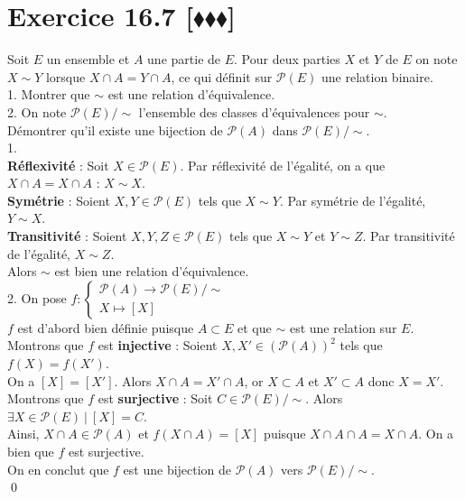 \documentclass[10pt]{article}
\begin{document}

\section*{Exercice 16.7 [$\blacklozenge\blacklozenge\blacklozenge$]}
\begin{tcolorbox}[enhanced, width=7.6in, center, size=fbox, fontupper=\large, drop shadow southwest]
    Soit $E$ un ensemble et $A$ une partie de $E$. Pour deux parties $X$ et $Y$ de $E$ on note $X\sim Y$ lorsque $X \cap A = Y \cap A$, ce qui définit sur $\mathcal{P}(E)$ une relation binaire.\\
    1. Montrer que $\sim$ est une relation d'équivalence.\\
    2. On note $\mathcal{P}(E)/\sim$ l'ensemble des classes d'équivalences pour $\sim$.\\
    Démontrer qu'il existe une bijection de $\mathcal{P}(A)$ dans $\mathcal{P}(E)/\sim$.\\[0.2cm]
    1.\\
    \textbf{Réflexivité} : Soit $X\in\mathcal{P}(E)$. Par réflexivité de l'égalité, on a que $X \cap A = X \cap A$ : $X \sim X$.\\
    \textbf{Symétrie} : Soient $X,Y\in\mathcal{P}(E)$ tels que $X \sim Y$. Par symétrie de l'égalité, $Y \sim X$.\\
    \textbf{Transitivité} : Soient $X,Y,Z \in \mathcal{P}(E)$ tels que $X \sim Y$ et $Y \sim Z$. Par transitivité de l'égalité, $X \sim Z$.\\
    Alors $\sim$ est bien une relation d'équivalence.\\[0.15cm]
    2. 
    On pose $f:\begin{cases}
        \mathcal{P}(A) \to \mathcal{P}(E)/\sim\\
        X \mapsto [X]
    \end{cases}$\\
    $f$ est d'abord bien définie puisque $A \subset E$ et que $\sim$ est une relation sur $E$.\\[0.15cm]
    Montrons que $f$ est \textbf{injective} : Soient $X,X' \in (\mathcal{P}(A))^2$ tels que $f(X) = f(X')$.\\
    On a $[X] = [X']$. Alors $X \cap A = X' \cap A$, or $X \subset A$ et $X' \subset A$ donc $X = X'$.\\[0.15cm]
    Montrons que $f$ est \textbf{surjective} : Soit $C\in\mathcal{P}(E)/\sim$. Alors $\exists X \in \mathcal{P}(E) ~ | ~ [X] = C$.\\
    Ainsi, $X \cap A \in \mathcal{P}(A)$ et $f(X \cap A) = [X]$ puisque $X \cap A \cap A = X \cap A$. On a bien que $f$ est surjective.\\[0.15cm]
    On en conclut que $f$ est une bijection de $\mathcal{P}(A)$ vers $\mathcal{P}(E)/\sim$.\\
    \qed
\end{tcolorbox}
\end{document}
